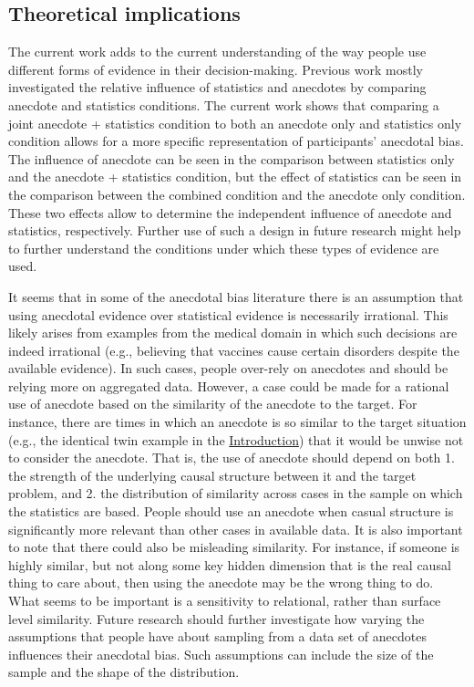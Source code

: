 \documentclass[a4paper, nobind, dvipsnames]{templates/ociamthesis}
\theoremstyle{definition}
\theoremstyle{definition}
\theoremstyle{definition}
\theoremstyle{definition}
\theoremstyle{remark}
\begin{document}
\subsection{Theoretical implications}

The current work adds to the current understanding of the way people use
different forms of evidence in their decision-making. Previous work mostly
investigated the relative influence of statistics and anecdotes by comparing
anecdote and statistics conditions. The current work shows that comparing a
joint anecdote + statistics condition to both an anecdote only and statistics
only condition allows for a more specific representation of participants'
anecdotal bias. The influence of anecdote can be seen in the comparison between
statistics only and the anecdote + statistics condition, but the effect of
statistics can be seen in the comparison between the combined condition and the
anecdote only condition. These two effects allow to determine the independent
influence of anecdote and statistics, respectively. Further use of such a design
in future research might help to further understand the conditions under which
these types of evidence are used.

It seems that in some of the anecdotal bias literature there is an assumption
that using anecdotal evidence over statistical evidence is necessarily
irrational. This likely arises from examples from the medical domain in which
such decisions are indeed irrational (e.g., believing that vaccines cause
certain disorders despite the available evidence). In such cases, people
over-rely on anecdotes and should be relying more on aggregated data. However, a
case could be made for a rational use of anecdote based on the similarity of the
anecdote to the target. For instance, there are times in which an anecdote is so
similar to the target situation (e.g., the identical twin example in the
\protect\hyperlink{effect-of-similarity-anecdotes}{Introduction}) that it would be unwise not to
consider the anecdote. That is, the use of anecdote should depend on both 1. the
strength of the underlying causal structure between it and the target problem,
and 2. the distribution of similarity across cases in the sample on which the
statistics are based. People should use an anecdote when casual structure is
significantly more relevant than other cases in available data. It is also
important to note that there could also be misleading similarity. For instance,
if someone is highly similar, but not along some key hidden dimension that is
the real causal thing to care about, then using the anecdote may be the wrong
thing to do. What seems to be important is a sensitivity to relational, rather
than surface level similarity. Future research should further investigate how
varying the assumptions that people have about sampling from a data set of
anecdotes influences their anecdotal bias. Such assumptions can include the size
of the sample and the shape of the distribution.
\end{document}
